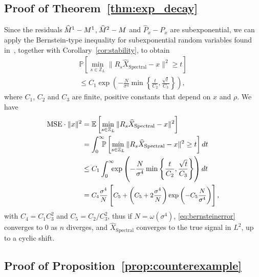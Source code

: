 \documentclass{IEEEtran}
\numberwithin{equation}{section}
\numberwithin{figure}{section}
\theoremstyle{plain}
\theoremstyle{definition}
\theoremstyle{remark}
\theoremstyle{plain}
\theoremstyle{remark}
\theoremstyle{plain}
\theoremstyle{plain}
\theoremstyle{remark}
\newcommand{\E}{\mathbb{E}}
\newcommand{\F}{F}
\newcommand{\DFT}{\operatorname{DFT}}
\newcommand{\Z}{{\mathbb{Z}}}
\newcommand{\MSE}{\mathrm{MSE}}
\newcommand{\hatM}{\widehat{\hspace{-1pt}M}\phantom{\hspace{-11pt}M}}
\begin{document}
\subsection{Proof of Theorem~\ref{thm:exp_decay}}
\label{sec:proof_spectral l2 convergence}

Since the residuals $\hatM^1 - M^1$, $\hatM^2 - M$ and $\widehat{P}_{x} - P_{x}$ are subexponential, we can apply the Bernstein-type inequality for subexponential random variables found in~\cite{vershynin2010intro}, together with Corollary~\ref{cor:stability}, to obtain
%
\begin{multline}
\mathbb{P} \left[  \min_{s\in\Z_L} \| R_s\widehat{X}_{\text{Spectral}} - x \|^2 \ge t \right]\\
\le C_1\exp\left(-\frac{N}{\sigma^4} \min\left\{\frac{t}{C_2},\frac{\sqrt t}{C_3}\right\} \right)  \label{eq:bernstein},	
\end{multline}
%
where $C_1$, $C_2$ and $C_3$ are finite, positive constants that depend on $x$ and $\rho$. We have
\begin{align}
\nonumber \MSE \cdot \|x\|^2 &=\E \left[  \min_{s\in\Z_L} \| R_s\widehat{X}_{\text{Spectral}} - x \|^2 \right]\\
\nonumber &=\int_{0}^{\infty} \hspace{-.2cm}\mathbb{P} \left[  \min_{s\in\Z_L} \| R_s\widehat{X}_{\text{Spectral}} - x \|^2 \ge t \right]dt\\
\nonumber &\le C_1\int_{0}^{\infty} \hspace{-.2cm}\exp\left(-\frac{N}{\sigma^4} \min\left\{\frac{t}{C_2},\frac{\sqrt t}{C_3}\right\} \right) dt\\
&=\text{\small $\displaystyle C_4\frac{ \sigma^4}{N}\left[C_5+\left(C_5+2\frac{\sigma^4}{N}\right)\exp\left(-C_5\frac{N}{\sigma^4}\right)\right],$} \label{eq:bernsteinerror}
\end{align}
with $C_4=C_1C_3^2$ and $C_5=C_2/C_3^2$, thus if $N=\omega(\sigma^4)$, \eqref{eq:bernsteinerror} converges to $0$ as $n$ diverges, and $\widehat{X}_{\text{Spectral}}$ converges to the true signal in $L^2$, up to a cyclic shift.

\subsection{Proof of Proposition~\ref{prop:counterexample}} \label{sec:proof_prop_counterexample}


\begin{comment}
We prove the proposition by construction. Let $x_1$ be a signal with a non-vanishing $\DFT$ $\F{x_1}$. Define a second signal $x_2$ so that
\begin{equation} \label{eqn:x2Definition} 
(\F{x_2})[k] = \left\{
\begin{array}{ll}
(\F{x_1})[k],  & k=t\frac{L}{\ell}, \quad t=0,\ldots,\ell-1 , \\
-(\F{x_1})[k], & \mbox{  otherwise. }
\end{array}
\right.
\end{equation}
\end{comment}
\end{document}
